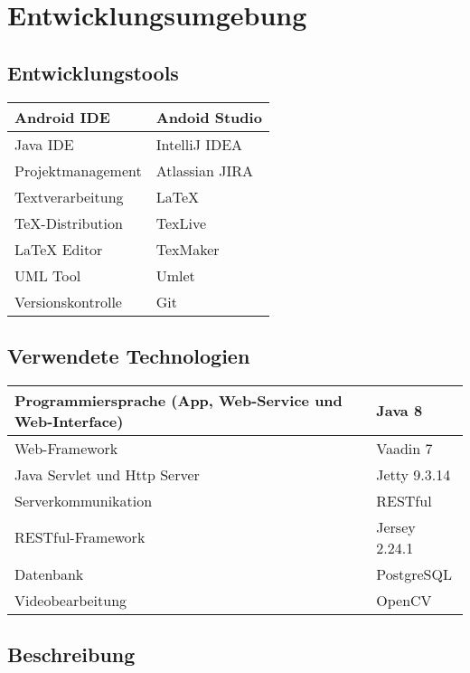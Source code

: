 \chapter{Entwicklungsumgebung}

\section{Entwicklungstools}

\begin{flushleft}
\begin{tabularx} {\textwidth}{|X|X|} \hline
Android IDE & Andoid Studio \\ \hline
Java IDE & IntelliJ IDEA \\ \hline
Projektmanagement & Atlassian JIRA \\ \hline
Textverarbeitung & LaTeX \\ \hline
TeX-Distribution & TexLive \\ \hline
LaTeX Editor & TexMaker \\ \hline
UML Tool & Umlet \\ \hline
Versionskontrolle & Git \\ \hline
\end{tabularx}
\end{flushleft}

\section{Verwendete Technologien}

\begin{flushleft}
\begin{tabularx} {\textwidth}{|X|X|} \hline
Programmiersprache (App, Web-Service und Web-Interface) & Java 8 \\ \hline
Web-Framework & Vaadin 7 \\ \hline
Java Servlet und Http Server & Jetty 9.3.14 \\ \hline
Serverkommunikation & RESTful \\ \hline
RESTful-Framework & Jersey 2.24.1 \\ \hline
Datenbank & PostgreSQL \\ \hline
Videobearbeitung & OpenCV \\ \hline
\end{tabularx}
\end{flushleft}

\section{Beschreibung}

